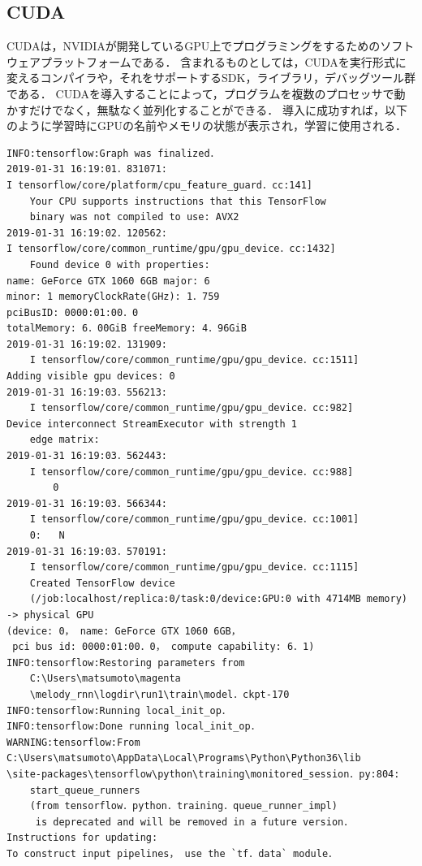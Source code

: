 \subsection{CUDA}
CUDAは，NVIDIAが開発しているGPU上でプログラミングをするためのソフトウェアプラットフォームである．
含まれるものとしては，CUDAを実行形式に変えるコンパイラや，それをサポートするSDK，ライブラリ，デバッグツール群である．
CUDAを導入することによって，プログラムを複数のプロセッサで動かすだけでなく，無駄なく並列化することができる．
導入に成功すれば，以下のように学習時にGPUの名前やメモリの状態が表示され，学習に使用される．
\begin{lstlisting}[basicstyle=\ttfamily\footnotesize,frame=single]
INFO:tensorflow:Graph was finalized．
2019-01-31 16:19:01．831071: 
I tensorflow/core/platform/cpu_feature_guard．cc:141]
    Your CPU supports instructions that this TensorFlow
    binary was not compiled to use: AVX2
2019-01-31 16:19:02．120562: 
I tensorflow/core/common_runtime/gpu/gpu_device．cc:1432]
    Found device 0 with properties:
name: GeForce GTX 1060 6GB major: 6 
minor: 1 memoryClockRate(GHz): 1．759
pciBusID: 0000:01:00．0
totalMemory: 6．00GiB freeMemory: 4．96GiB
2019-01-31 16:19:02．131909:
    I tensorflow/core/common_runtime/gpu/gpu_device．cc:1511] 
Adding visible gpu devices: 0
2019-01-31 16:19:03．556213:
    I tensorflow/core/common_runtime/gpu/gpu_device．cc:982]
Device interconnect StreamExecutor with strength 1
    edge matrix:
2019-01-31 16:19:03．562443:
    I tensorflow/core/common_runtime/gpu/gpu_device．cc:988]
        0
2019-01-31 16:19:03．566344:
    I tensorflow/core/common_runtime/gpu/gpu_device．cc:1001]
    0:   N
2019-01-31 16:19:03．570191:
    I tensorflow/core/common_runtime/gpu/gpu_device．cc:1115]
    Created TensorFlow device
    (/job:localhost/replica:0/task:0/device:GPU:0 with 4714MB memory)
-> physical GPU 
(device: 0， name: GeForce GTX 1060 6GB，
 pci bus id: 0000:01:00．0， compute capability: 6．1)
INFO:tensorflow:Restoring parameters from
    C:\Users\matsumoto\magenta
    \melody_rnn\logdir\run1\train\model．ckpt-170
INFO:tensorflow:Running local_init_op．
INFO:tensorflow:Done running local_init_op．
WARNING:tensorflow:From 
C:\Users\matsumoto\AppData\Local\Programs\Python\Python36\lib
\site-packages\tensorflow\python\training\monitored_session．py:804:
    start_queue_runners 
    (from tensorflow．python．training．queue_runner_impl)
     is deprecated and will be removed in a future version．
Instructions for updating:
To construct input pipelines， use the `tf．data` module．
\end{lstlisting}
